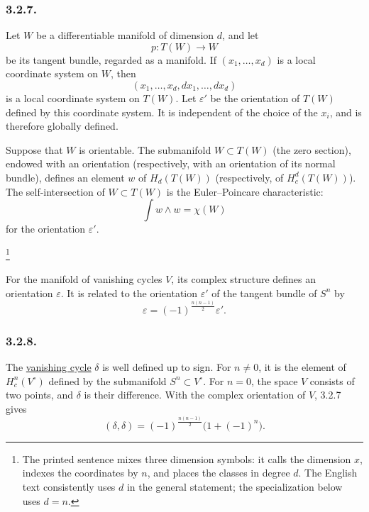 \subsubsection*{3.2.7.}
Let $W$ be a differentiable manifold of dimension $d$, and let
\[
p:T(W)\longrightarrow W
\]
be its tangent bundle, regarded as a manifold.  If
$(x_1,\ldots,x_d)$ is a local coordinate system on $W$, then
\[
(x_1,\ldots,x_d,dx_1,\ldots,dx_d)
\]
is a local coordinate system on $T(W)$.  Let $\varepsilon'$ be the
orientation of $T(W)$ defined by this coordinate system.  It is
independent of the choice of the $x_i$, and is therefore globally
defined.

Suppose that $W$ is orientable.  The submanifold $W\subset T(W)$ (the
zero section), endowed with an orientation (respectively, with an
orientation of its normal bundle), defines an element $w$ of
$H_d(T(W))$ (respectively, of $H_c^d(T(W))$).  The self-intersection
of $W\subset T(W)$ is the Euler--Poincare characteristic:
\[
\int w\wedge w=\chi(W)
\]
for the orientation $\varepsilon'$.

\footnote{The printed sentence mixes three dimension symbols: it calls
the dimension $x$, indexes the coordinates by $n$, and places the
classes in degree $d$.  The English text consistently uses $d$ in the
general statement; the specialization below uses $d=n$.}

For the manifold of vanishing cycles $V$, its complex structure
defines an orientation $\varepsilon$.  It is related to the
orientation $\varepsilon'$ of the tangent bundle of $S^n$ by
\[
\varepsilon=(-1)^{\frac{n(n-1)}2}\varepsilon'.
\]

\subsubsection*{3.2.8.}
The \underline{vanishing cycle} $\delta$ is well defined up to sign.
For $n\ne0$, it is the element of $H_c^n(V^\circ)$ defined by the
submanifold $S^n\subset V^\circ$.  For $n=0$, the space $V$ consists
of two points, and $\delta$ is their difference.  With the complex
orientation of $V$, 3.2.7 gives
\begin{equation}\tag{3.2.8.1}
(\delta,\delta)
=(-1)^{\frac{n(n-1)}2}\bigl(1+(-1)^n\bigr).
\end{equation}

